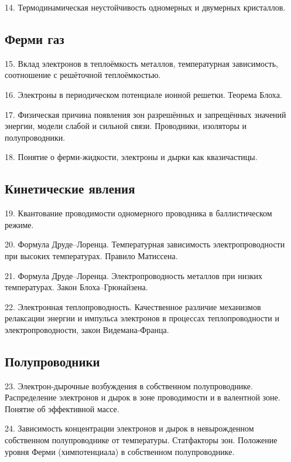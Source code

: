 14. Термодинамическая неустойчивость одномерных и двумерных кристаллов.




\subsection*{Ферми газ}
15. Вклад электронов в теплоёмкость металлов, температурная зависимость, соотношение с решёточной теплоёмкостью.

16. Электроны в периодическом потенциале ионной решетки. Теорема Блоха.

17. Физическая причина появления зон разрешённых и запрещённых значений энергии, модели слабой и сильной связи. Проводники, изоляторы и полупроводники.

18. Понятие о ферми-жидкости, электроны и дырки как квазичастицы.





\subsection*{Кинетические явления}

19. Квантование проводимости одномерного проводника в баллистическом режиме.

20. Формула Друде--Лоренца. Температурная зависимость электропроводности при высоких температурах. Правило Матиссена.

21. Формула Друде--Лоренца. Электропроводность металлов при низких температурах. Закон Блоха--Грюнайзена.

22. Электронная теплопроводность. Качественное различие механизмов релаксации энергии и импульса электронов в процессах теплопроводности и электропроводности, закон Видемана-Франца.






\subsection*{Полупроводники}

23. Электрон-дырочные возбуждения в собственном полупроводнике. Распределение электронов и дырок в зоне проводимости и в валентной зоне. Понятие об эффективной массе.

24. Зависимость концентрации электронов и дырок в невырожденном собственном полупроводнике от температуры. Статфакторы зон. Положение уровня Ферми (химпотенциала) в собственном полупроводнике.

